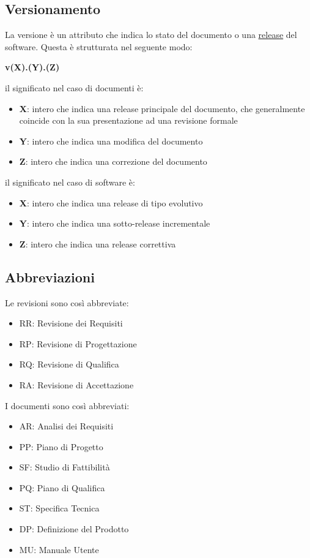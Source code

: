 \documentclass[a4paper,11pt]{article}
\begin{document}
\subsection{Versionamento}
La versione \`e un attributo che indica lo stato del documento o una \underline{release} del software. Questa \`e strutturata nel seguente modo:
\begin{center}
\textbf{v(X).(Y).(Z)}
\end{center}
il significato nel caso di documenti \`e:
\begin{itemize}
\item \textbf{X}: intero che indica una release principale del documento, che generalmente coincide con la sua presentazione ad una revisione formale
\item \textbf{Y}: intero che indica una modifica del documento
\item \textbf{Z}: intero che indica una correzione del documento
\end{itemize}
il significato nel caso di software \`e:
\begin{itemize}
\item \textbf{X}: intero che indica una release di tipo evolutivo
\item \textbf{Y}: intero che indica una sotto-release incrementale  
\item \textbf{Z}: intero  che indica una release correttiva 
\end{itemize}
\subsection{Abbreviazioni}
Le revisioni sono cos\`i abbreviate:
\begin{itemize}
\item RR: Revisione dei Requisiti
\item RP: Revisione di Progettazione
\item RQ: Revisione di Qualifica
\item RA: Revisione di Accettazione
\end{itemize}
I documenti sono cos\`i abbreviati:
\begin{itemize}
\item AR: Analisi dei Requisiti
\item PP: Piano di Progetto
\item SF: Studio di Fattibilit\`a
\item PQ: Piano di Qualifica
\item ST: Specifica Tecnica
\item DP: Definizione del Prodotto
\item MU: Manuale Utente
\end{itemize}
\end{document}
